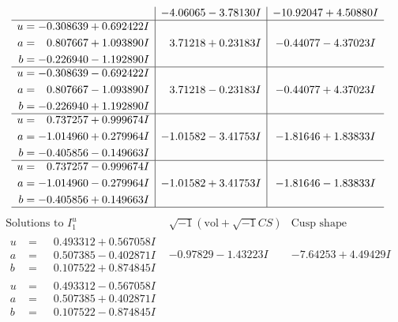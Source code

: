 \documentclass[1p]{elsarticle_modified}
\theoremstyle{definition}
\newcommand{\I}{\sqrt{-1}}
\begin{document}
$$\begin{array}{c|c|c}
 & -4.06065 - 3.78130 I & -10.92047 + 4.50880 I \\ \hline\begin{aligned}
u &= -0.308639 + 0.692422 I \\
a &= \phantom{-}0.807667 + 1.093890 I \\
b &= -0.226940 - 1.192890 I\end{aligned}
 & \phantom{-}3.71218 + 0.23183 I & -0.44077 - 4.37023 I \\ \hline\begin{aligned}
u &= -0.308639 - 0.692422 I \\
a &= \phantom{-}0.807667 - 1.093890 I \\
b &= -0.226940 + 1.192890 I\end{aligned}
 & \phantom{-}3.71218 - 0.23183 I & -0.44077 + 4.37023 I \\ \hline\begin{aligned}
u &= \phantom{-}0.737257 + 0.999674 I \\
a &= -1.014960 + 0.279964 I \\
b &= -0.405856 - 0.149663 I\end{aligned}
 & -1.01582 - 3.41753 I & -1.81646 + 1.83833 I \\ \hline\begin{aligned}
u &= \phantom{-}0.737257 - 0.999674 I \\
a &= -1.014960 - 0.279964 I \\
b &= -0.405856 + 0.149663 I\end{aligned}
 & -1.01582 + 3.41753 I & -1.81646 - 1.83833 I\\
 \hline 
 \end{array}$$\newpage$$\begin{array}{c|c|c}  
\text{Solutions to }I^u_{1}& \I (\text{vol} + \sqrt{-1}CS) & \text{Cusp shape}\\
 \hline 
\begin{aligned}
u &= \phantom{-}0.493312 + 0.567058 I \\
a &= \phantom{-}0.507385 - 0.402871 I \\
b &= \phantom{-}0.107522 + 0.874845 I\end{aligned}
 & -0.97829 - 1.43223 I & -7.64253 + 4.49429 I \\ \hline\begin{aligned}
u &= \phantom{-}0.493312 - 0.567058 I \\
a &= \phantom{-}0.507385 + 0.402871 I \\
b &= \phantom{-}0.107522 - 0.874845 I\end{aligned}

\end{array}$$
\end{document}
